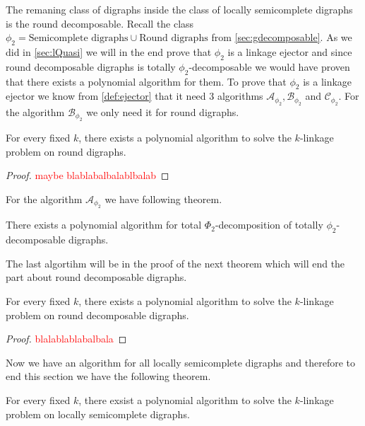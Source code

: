 The remaning class of digraphs inside the class of locally semicomplete digraphs is the round decomposable. 
Recall the class $\phi_2=\text{Semicomplete digraphs}\cup\text{Round digraphs}$ from \autoref{sec:gdecomposable}.
As we did in \autoref{sec:lQuasi} we will in the end prove that $\phi_2$ is a linkage ejector and since round decomposable digraphs is totally $\phi_2$-decomposable we would have proven that there exists a polynomial algorithm for them.
To prove that $\phi_2$ is a linkage ejector we know from \autoref{def:ejector} that it need 3 algorithms $\mathcal{A}_{\phi_2},\mathcal{B}_{\phi_2}$ and $\mathcal{C}_{\phi_2}$. For the algorithm $\mathcal{B}_{\phi_2}$ we only need it for round digraphs.
\begin{thm}
    For every fixed $k$, there exists a polynomial algorithm to solve the $k$-linkage problem on round digraphs.
\end{thm}
\begin{proof}
    \textcolor{red}{maybe blablabalbalablbalab}
\end{proof}
For the algorithm $\mathcal{A}_{\phi_2}$ we have following theorem.
\begin{thm}
    There exists a polynomial algorithm for total $\Phi_2$-decomposition of totally $\phi_2$-decomposable digraphs.
\end{thm}
The last algortihm will be in the proof of the next theorem which will end the part about round decomposable digraphs.
\begin{thm}
    For every fixed $k$, there exists a polynomial algorithm to solve the $k$-linkage problem on round decomposable digraphs.
\end{thm}
\begin{proof}
    \textcolor{red}{blalablablabalbala}
\end{proof}
Now we have an algorithm for all locally semicomplete digraphs and therefore to end this section we have the following theorem.
\begin{thm}
    For every fixed $k$, there exsist a polynomial algorithm to solve the $k$-linkage problem on locally semicomplete digraphs.
\end{thm}
